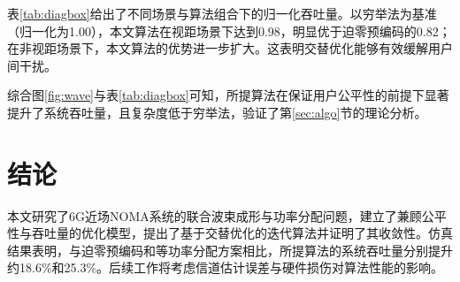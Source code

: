 \documentclass[UTF8, a4paper, zihao=-4, fontset=windows, twocolumn]{ctexart}
\theoremstyle{plain}
\theoremstyle{definition}
\theoremstyle{plain}
\begin{document}

表\ref{tab:diagbox}给出了不同场景与算法组合下的归一化吞吐量。以穷举法为基准（归一化为1.00），本文算法在视距场景下达到0.98，明显优于迫零预编码的0.82；在非视距场景下，本文算法的优势进一步扩大。这表明交替优化能够有效缓解用户间干扰。

\begin{table}[htbp]
\centering
\caption{不同场景下的归一化吞吐量}\label{tab:diagbox}
\end{table}

综合图\ref{fig:wave}与表\ref{tab:diagbox}可知，所提算法在保证用户公平性的前提下显著提升了系统吞吐量，且复杂度低于穷举法，验证了第\ref{sec:algo}节的理论分析。

\section{结论}\label{sec:concl}

本文研究了6G近场NOMA系统的联合波束成形与功率分配问题，建立了兼顾公平性与吞吐量的优化模型，提出了基于交替优化的迭代算法并证明了其收敛性。仿真结果表明，与迫零预编码和等功率分配方案相比，所提算法的系统吞吐量分别提升约18.6\%和25.3\%。后续工作将考虑信道估计误差与硬件损伤对算法性能的影响。



\end{document}
